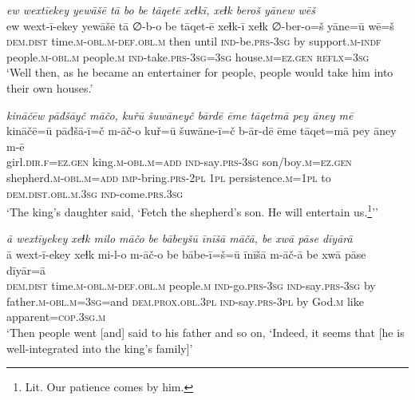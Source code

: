 \ea \label{KŠ.38}
\textit{ew wextīekey yewāšē tā bo be tāqetē xeɫkī, xeɫk beroš yānew wēš} \\ 
\gll ew wext-ī-ekey yewāšē tā ∅-b-o be tāqet-ē xeɫk-ī xeɫk ∅-ber-o=š yāne=ū wē=š \\ 
 \textsc{dem.dist} time\textsc{.m}\textsc{-obl}\textsc{.m}\textsc{-def}\textsc{.obl}\textsc{.m} then until \textsc{ind-}be\textsc{.prs}\textsc{-3sg} by support\textsc{.m}\textsc{-indf} people\textsc{.m}\textsc{-obl}\textsc{.m} people\textsc{.m} \textsc{ind-}take\textsc{.prs}\textsc{-3sg}\textsc{=3sg} house\textsc{.m}\textsc{=ez.gen} \textsc{reflx}\textsc{=3sg} \\ 
\glt `Well then, as he became an entertainer for people, people would take him into their own houses.'
\z 
 
\ea \label{KŠ.40}
\textit{kināčēw pāđšāyč māčo, kuřū šuwāneyč bārdē ēme tāqetmā pey āney mē} \\ 
\gll kināčē=ū pāđšā-ī=č m-āč-o kuř=ū šuwāne-ī=č b-ār-dē ēme tāqet=mā pey āney m-ē \\ 
 girl\textsc{.dir}\textsc{.f}\textsc{=ez.gen} king\textsc{.m}\textsc{-obl}\textsc{.m}\textsc{=add} \textsc{ind-}say\textsc{.prs}\textsc{-3sg} son/boy\textsc{.m}\textsc{=ez.gen} shepherd\textsc{.m}\textsc{-obl}\textsc{.m}\textsc{=add} \textsc{imp-}bring\textsc{.prs}-\textsc{2pl} \textsc{1pl} persistence\textsc{.m}\textsc{=\textsc{1pl}} to \textsc{dem.dist}\textsc{.obl}\textsc{.m}\textsc{.3sg} \textsc{ind-}come\textsc{.prs}\textsc{.3sg} \\ 
\glt `The king’s daughter said, ‘Fetch the shepherd’s son. He will entertain us.\footnote{Lit. Our patience comes by him.}’'
\z 
 
\ea \label{KŠ.46}
\textit{ā wextīyekey xeɫk milo māčo be bābeyšū īnīšā māčā, be xwā pāse dīyārā} \\ 
\gll ā wext-ī-ekey xeɫk mi-l-o m-āč-o be bābe-ī=š=ū īnīšā m-āč-ā be xwā pāse dīyār=ā \\ 
 \textsc{dem.dist} time\textsc{.m}\textsc{-obl}\textsc{.m}\textsc{-def}\textsc{.obl}\textsc{.m} people\textsc{.m} \textsc{ind-}go\textsc{.prs}\textsc{-3sg} \textsc{ind-}say\textsc{.prs}\textsc{-3sg} by father\textsc{.m}\textsc{-obl}\textsc{.m}\textsc{=3sg}=and \textsc{dem.prox}\textsc{.obl}\textsc{.3pl} \textsc{ind-}say\textsc{.prs}\textsc{-3pl} by God\textsc{.m} like apparent\textsc{=cop}\textsc{.3sg}\textsc{.m} \\ 
\glt `Then people went [and] said to his father and so on, ‘Indeed, it seems that [he is well-integrated into the king’s family]'
\z 
 
